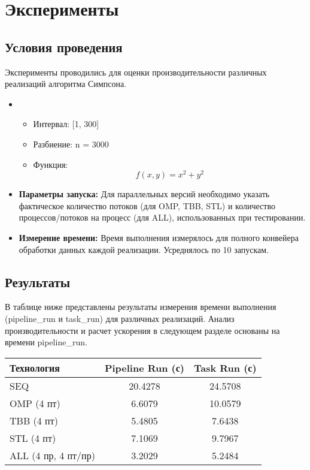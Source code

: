 \documentclass[12pt]{article}
\begin{document}
\newpage
\section{Эксперименты}
\subsection{Условия проведения}
Эксперименты проводились для оценки производительности различных реализаций алгоритма Симпсона.
\begin{itemize}
    \item {}
        \begin{itemize}
            \item Интервал: [1, 300]
            \item Разбиение: n = 3000
            \item Функция: \[ f(x, y) = x^2 + y^2 \]
        \end{itemize}

    \item \textbf{Параметры запуска:} Для параллельных версий необходимо указать фактическое количество потоков (для OMP, TBB, STL) и количество процессов/потоков на процесс (для ALL), использованных при тестировании.
    \item \textbf{Измерение времени:} Время выполнения измерялось для полного конвейера обработки данных каждой реализации. Усреднялось по 10 запускам.
\end{itemize}

\subsection{Результаты}
В таблице ниже представлены результаты измерения времени выполнения (pipeline\_run и task\_run) для различных реализаций. Анализ производительности и расчет ускорения в следующем разделе основаны на времени pipeline\_run.

\begin{center}
\begin{tabular}{|l|c|c|}
\hline
\textbf{Технология} & \textbf{Pipeline Run (с)} & \textbf{Task Run (с)} \\
\hline
SEQ                    & 20.4278           & 24.5708       \\
\hline
OMP (4 пт)             & 6.6079           & 10.0579       \\
\hline
TBB (4 пт)             & 5.4805           & 7.6438       \\
\hline
STL (4 пт)             & 7.1069           & 9.7967        \\
\hline
ALL (4 пр, 4 пт/пр)    & 3.2029           & 5.2484       \\
\hline
\end{tabular}
\end{center}
\end{document}
